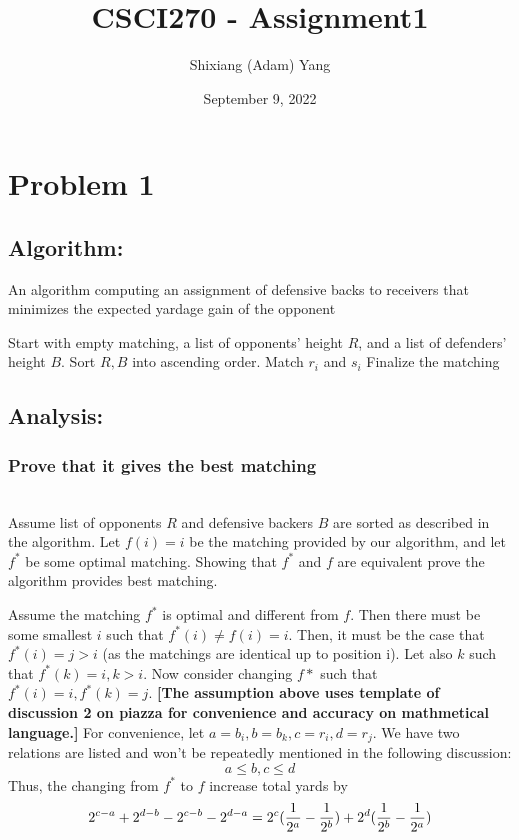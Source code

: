 \documentclass{article}
\author{Shixiang (Adam) Yang}
\date{September 9, 2022}
\title{CSCI270 - Assignment1}
\begin{document}
 \maketitle
\section{Problem 1}
    \subsection{Algorithm: }
    \begin{algorithm}
    \caption{An algorithm computing an assignment of defensive backs to receivers that minimizes the expected yardage gain of the opponent}\label{alg:cap}
    \begin{algorithmic}
    
    \State Start with empty matching, a list of opponents' height $R$, and a list of defenders' height $B$.
    \State Sort $R, B$ into ascending order.
        \State Match $r_i$ and $s_i$
    \EndFor
    \State Finalize the matching
    \end{algorithmic}
    \end{algorithm}


    \subsection{Analysis:}
        \subsubsection{Prove that it gives the best matching} 
        \\
        \indent Assume list of opponents $R$ and defensive backers $B$ are sorted as described in the algorithm. Let $f(i)=i$ be the matching provided by our algorithm, and let $f^*$ be some optimal matching. Showing that $f^*$ and $f$ are equivalent prove the algorithm provides best matching.
        
        Assume the matching $f^*$ is optimal and different from $f$. Then there must be some smallest $i$ such that $f^*(i) \neq f(i) = i$. Then, it must be the case that $f^*(i) = j > i$ (as the matchings are identical up to position i). Let also $k$ such that $f^*(k) = i, k > i$. Now consider changing $f*$ such that $f^*(i)=i, f^*(k)=j$. \textbf{[The assumption above uses template of discussion 2 on piazza for convenience and accuracy on mathmetical language.]} 
        For convenience, let $a=b_i, b=b_k, c=r_i, d=r_j$. We have two relations are listed and won't be repeatedly mentioned in the following discussion:
        \[a\leq b, c\leq d \]
        \indent Thus, the changing from $f^*$ to $f$ increase total yards by
        \[2^{c-a}+2^{d-b}-2^{c-b}-2^{d-a}\\
        =2^c(\frac{1}{2^a}-\frac{1}{2^b})+2^d(\frac{1}{2^b}-\frac{1}{2^a})
        \]
\end{document}
